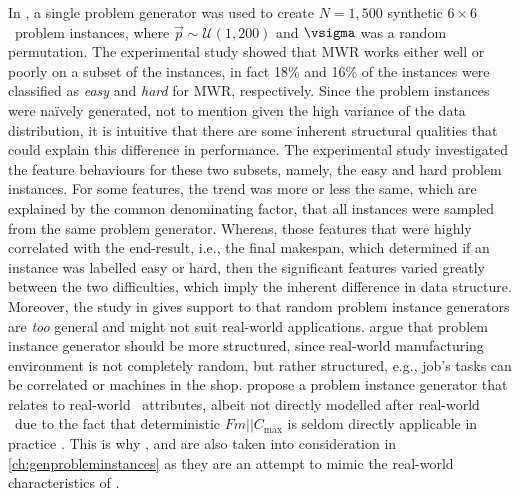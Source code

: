 In \citet{InRu12}, a single problem generator was used to create  $N=1,500$ synthetic $6\times6$ \jsp\ problem instances, where $\vec{p}\sim\mathcal{U}(1,200)$ and $\vsigma$ was a random permutation. The experimental study showed that MWR works either well or poorly on a subset of the instances, in fact 18\% and 16\% of the instances were classified as \emph{easy} and \emph{hard} for MWR, respectively. 
Since the problem instances were na\"{i}vely generated, not to mention given the high variance of the data distribution, it is intuitive that there are some inherent structural qualities that could explain this difference in performance. The experimental study investigated the feature behaviours for these two subsets, namely, the easy and hard problem instances. For some features, the trend was more or less the same, which are explained by the common denominating factor, that all instances were sampled from the same problem generator. Whereas, those features that were highly correlated with the end-result, i.e., the final makespan, which determined if an instance was labelled easy or hard, then the significant features varied greatly between the two difficulties, which imply the inherent difference in data structure. 
Moreover, the study in gives support to that random problem instance generators are \emph{too} general and might not suit real-world applications. \citet{Whitley} argue that problem instance generator should be more structured, since real-world manufacturing environment is not completely random, but rather structured, e.g.,  job's tasks can be correlated or machines in the shop. \citeauthor{Whitley} propose a problem instance generator that relates to real-world \fsp\ attributes, albeit not directly modelled after real-world \fsp\ due to the fact that deterministic $Fm||C_{\max}$ is seldom directly applicable in practice \citep{Dudek92}. This is why ,  and  are also taken into consideration in \cref{ch:genprobleminstances} as they are an attempt to mimic the real-world characteristics of \fsp.

